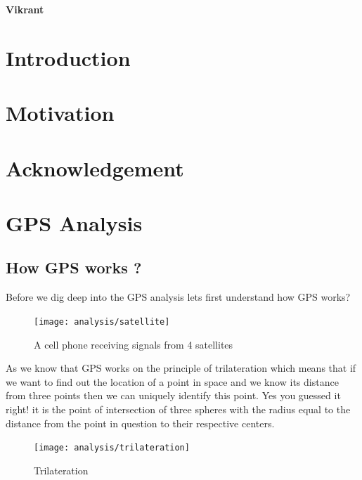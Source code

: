 \documentclass[12pt]{report}
\begin{document}


\vspace*{15px}
\begin{flushright}
{\textbf{Vikrant}}
\end{flushright}

\begin{abstract}
\end{abstract}

\tableofcontents


\setcounter{page}{1} 

\chapter{Introduction}
\label{sec:introduction_sec}

\chapter{Motivation}
\label{sec:motivation_sec}

\chapter{Acknowledgement}
\label{sec:acknowledgement_sec}


% 

\chapter{GPS Analysis}
\section{How GPS works ?}
Before we dig deep into the GPS analysis lets first understand how GPS works?

\begin{figure}[h]
  \centering
  \texttt{[image: analysis/satellite]}
  \caption{A cell phone receiving signals from 4 satellites}
  \label{satellite}
\end{figure}
As we know that GPS works on the principle of trilateration which means that if
we want to find out the location of a point in space and we know
it\textquotesingle s distance from three points then we can uniquely identify
this point. Yes you guessed it right! it is the point of intersection of three
spheres with the radius equal to the distance from the point in question to
their respective centers.
\begin{figure}[h]
  \centering
  \texttt{[image: analysis/trilateration]}
  \caption{Trilateration}
  \label{trilateration}
\end{figure}
\end{document}
